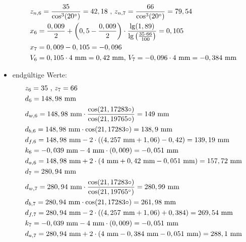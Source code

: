 \begin{itemize}
\begin{align*}
	&z_{n,6} = \frac{35}{\cos^3(20^\circ)} = 42,18 \text{ , }z_{n,7} = \frac{66}{\cos^3(20^\circ)} = 79,54 \\
	&x_6 =\frac{0,009}{2} + \left( 0,5 - \frac{0,009}{2} \right) \cdot \frac{\lg(1,89)}{\lg\left( \frac{35 \cdot 66}{100} \right)} = 0,105 \\
	&x_7 = 0,009 - 0,105 = - 0,096 \\ 
	&V_6 = 0,105 \cdot 4 \text{ mm} = 0,42 \text{ mm, }V_7 = -0,096\cdot 4 \text{ mm} = -0,384 \text{ mm} 
	\end{align*}
\item endgültige Werte:
\begin{align*}
	&z_6 = 35 \text{ , } z_7 = 66 \\
	&d_6 = 148,98 \text{ mm} \\
	&d_{w,6} = 148,98  \text{ mm}\cdot \frac{\cos(21,17283\circ)}{\cos(21,19765\circ)} = 149 \text{ mm}\\
	&d_{b,6} = 148,98  \text{ mm} \cdot \cos(21,17283\circ) = 138,9  \text{ mm}\\
	&d_{f,6} = 148,98  \text{ mm} -2 \cdot ((4,257 \text{ mm}+1,06)-0,42) = 139,19 \text{ mm}\\
	&k_6 = -0,039 \text{ mm} -4 \text{ mm} \cdot (0,009) =- 0,051 \text{ mm}\\
	&d_{a,6} = 148,98  \text{ mm} +2 \cdot (4\text{ mm}+0,42 \text{ mm} -0,051 \text{ mm}) = 157,72\text{ mm}\\
	&d_7 =280,94 \text{ mm} \\
	&d_{w,7} =280,94  \text{ mm}\cdot \frac{\cos(21,17283\circ)}{\cos(21,19765^\circ)} = 280,99  \text{ mm}\\
	&d_{b,7} = 280,94  \text{ mm} \cdot \cos(21,17283\circ) = 261,98 \text{ mm}\\
	&d_{f,7} = 280,94  \text{ mm} -2 \cdot ((4,257 \text{ mm}+1,06)+0,384) = 269,54 \text{ mm}\\
	&k_7 = -0,039 \text{ mm} -4 \text{ mm} \cdot (0,009) =- 0,051 \text{ mm}\\
	&d_{a,7} = 280,94  \text{ mm} +2 \cdot (4\text{ mm}-0,384 \text{ mm} -0,051 \text{ mm}) = 288,1\text{ mm}
\end{align*}	
\end{itemize}
